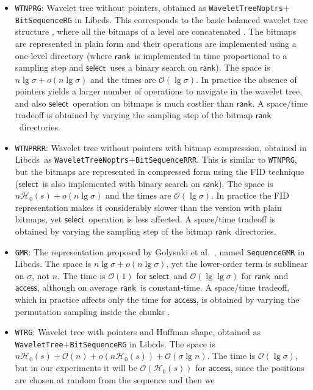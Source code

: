 \documentclass[11pt]{article}
\newcommand{\Oh}[1]
    {\ensuremath{\mathcal{O}\left( {#1} \right)}}
\newcommand{\access}
    {\ensuremath{\mathsf{access}}}
\newcommand{\rank}
    {\ensuremath{\mathsf{rank}}}
\newcommand{\select}
    {\ensuremath{\mathsf{select}}}
\newcommand{\HH}{\mathcal{H}}
\newcommand{\Ho}{\HH_0}
\newcommand{\libcds}{{\sc Libcds}}
\begin{document}
\begin{itemize}
\item \verb|WTNPRG|: Wavelet tree without pointers, obtained as
  \verb|WaveletTreeNoptrs|$+$\verb|BitSequenceRG| in \libcds. 
  This corresponds to the 
  basic balanced wavelet tree structure \cite{GGV03}, where all the bitmaps 
  of a level are concatenated \cite{MN07}. The bitmaps are represented in 
  plain form and their operations are implemented using a one-level directory 
  \cite{GGMN05} (where \rank\ is implemented in time proportional to a
  sampling step and \select\ uses a binary search on \rank). The space is
  $n\lg\sigma + o(n\lg\sigma)$ and the times are $\Oh{\lg\sigma}$. In
  practice the absence of pointers yields a larger number of operations to
  navigate in the wavelet tree, and also \select\ operation on bitmaps is
  much costlier than \rank. A space/time tradeoff is obtained by varying
  the sampling step of the bitmap \rank\ directories.
\item \verb|WTNPRRR|: Wavelet tree without pointers with bitmap compression, 
  obtained in \libcds\ as \verb|WaveletTreeNoptrs|$+$\verb|BitSequenceRRR|. 
  This is similar to \verb|WTNPRG|, but the bitmaps are represented in
  compressed form using the FID technique \cite{RRR02} (\select\ is also
  implemented with binary search on \rank). The space is
  $n\Ho(s) + o(n\lg\sigma)$ and the times are $\Oh{\lg\sigma}$. In practice
  the FID representation makes it considerably slower than the version with
  plain bitmaps, yet \select\ operation is less affected.
  A space/time tradeoff is obtained by varying the sampling
  step of the bitmap \rank\ directories.
\item \verb|GMR|: The representation proposed by Golysnki et al.~\cite{GMR06}, 
  named \verb|SequenceGMR| in \libcds. The space is $n\lg\sigma+o(n\lg\sigma)$,
  yet the lower-order term is sublinear on $\sigma$, not $n$. The time is
  $\Oh{1}$ for \select\ and $\Oh{\lg\lg\sigma}$ for \rank\ and \access, although
  on average \rank\ is constant-time. A space/time tradeoff, which in practice
  affects only the time for \access, is obtained by varying the permutation 
  sampling inside the chunks \cite{GMR06}.
\item \verb|WTRG|: Wavelet tree with pointers and Huffman shape, obtained as
  \verb|WaveletTree|$+$\verb|BitSequenceRG| in \libcds. 
  The space is $n\Ho(s) + \Oh{n} + o(n\Ho(s)) + \Oh{\sigma\lg n}$. The time is 
  $\Oh{\lg\sigma}$, but in our experiments it will be $\Oh{\Ho(s)}$ for \access,
  since the positions are chosen at random from the sequence and then we 

\end{itemize}
\end{document}
